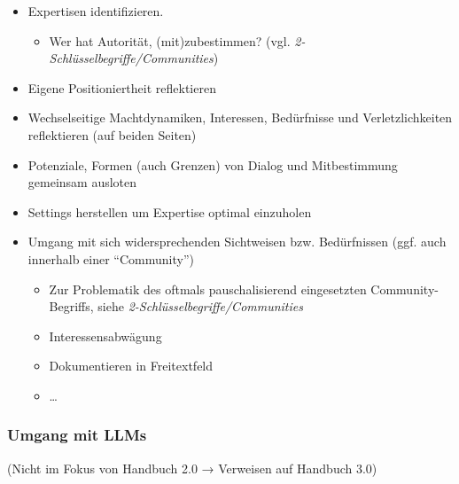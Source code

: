 \documentclass[
  letterpaper,
  DIV=11,
  numbers=noendperiod]{scrartcl}
\providecommand{\tightlist}{%
  \setlength{\itemsep}{0pt}\setlength{\parskip}{0pt}}\usepackage{longtable,booktabs,array}
\begin{document}
\begin{itemize}
\tightlist
\item
  Expertisen identifizieren.

  \begin{itemize}
  \tightlist
  \item
    Wer hat Autorität, (mit)zubestimmen? (vgl.
    \emph{2-Schlüsselbegriffe/Communities})
  \end{itemize}
\item
  Eigene Positioniertheit reflektieren
\item
  Wechselseitige Machtdynamiken, Interessen, Bedürfnisse und
  Verletzlichkeiten reflektieren (auf beiden Seiten)
\item
  Potenziale, Formen (auch Grenzen) von Dialog und Mitbestimmung
  gemeinsam ausloten
\item
  Settings herstellen um Expertise optimal einzuholen
\item
  Umgang mit sich widersprechenden Sichtweisen bzw. Bedürfnissen (ggf.
  auch innerhalb einer ``Community'')

  \begin{itemize}
  \tightlist
  \item
    Zur Problematik des oftmals pauschalisierend eingesetzten
    Community-Begriffs, siehe \emph{2-Schlüsselbegriffe/Communities}
  \item
    Interessensabwägung
  \item
    Dokumentieren in Freitextfeld
  \item
    \ldots{}
  \end{itemize}
\end{itemize}

\subsubsection{Umgang mit LLMs}\label{umgang-mit-llms}

(Nicht im Fokus von Handbuch 2.0 → Verweisen auf Handbuch 3.0)
\end{document}
